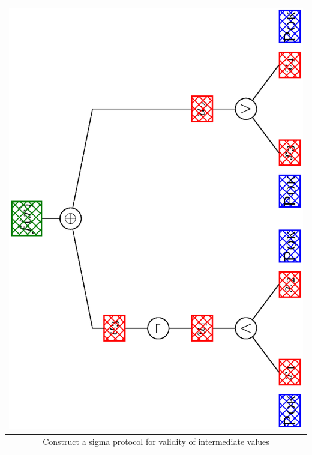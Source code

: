 \documentclass[landscape,dvips,footrule]{foils}
\begin{document}
\begin{center}
\begin{tabular}{|c|}
 \includegraphics[scale=0.18, angle=-90, clip, trim=3.0cm 0.0cm 3.5cm 0.0cm]{augmented-circuit-i.eps}\\
\hline
 Construct a sigma protocol for validity of intermediate values\\ 

\end{tabular}
\end{center}
\end{document}
